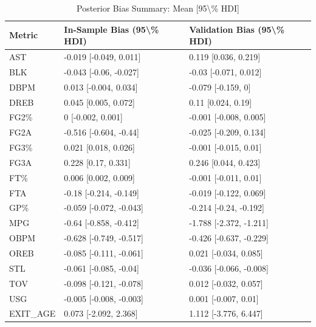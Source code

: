 \begin{table}[t]
\caption*{
{\fontsize{20}{25}\selectfont  Posterior Bias Summary: Mean [95\textbackslash{}\% HDI]\fontsize{12}{15}\selectfont }
} 
\fontsize{12.0pt}{14.0pt}\selectfont
\begin{tabular*}{\linewidth}{@{\extracolsep{\fill}}lll}
\toprule
Metric & In-Sample Bias (95\textbackslash{}\% HDI) & Validation Bias (95\textbackslash{}\% HDI) \\ 
\midrule\addlinespace[2.5pt]
AST & -0.019 [-0.049, 0.011] & 0.119 [0.036, 0.219] \\ 
BLK & -0.043 [-0.06, -0.027] & -0.03 [-0.071, 0.012] \\ 
DBPM & 0.013 [-0.004, 0.034] & -0.079 [-0.159, 0] \\ 
DREB & 0.045 [0.005, 0.072] & 0.11 [0.024, 0.19] \\ 
FG2\% & 0 [-0.002, 0.001] & -0.001 [-0.008, 0.005] \\ 
FG2A & -0.516 [-0.604, -0.44] & -0.025 [-0.209, 0.134] \\ 
FG3\% & 0.021 [0.018, 0.026] & -0.001 [-0.015, 0.01] \\ 
FG3A & 0.228 [0.17, 0.331] & 0.246 [0.044, 0.423] \\ 
FT\% & 0.006 [0.002, 0.009] & -0.001 [-0.011, 0.01] \\ 
FTA & -0.18 [-0.214, -0.149] & -0.019 [-0.122, 0.069] \\ 
GP\% & -0.059 [-0.072, -0.043] & -0.214 [-0.24, -0.192] \\ 
MPG & -0.64 [-0.858, -0.412] & -1.788 [-2.372, -1.211] \\ 
OBPM & -0.628 [-0.749, -0.517] & -0.426 [-0.637, -0.229] \\ 
OREB & -0.085 [-0.111, -0.061] & 0.021 [-0.034, 0.085] \\ 
STL & -0.061 [-0.085, -0.04] & -0.036 [-0.066, -0.008] \\ 
TOV & -0.098 [-0.121, -0.078] & 0.012 [-0.032, 0.057] \\ 
USG & -0.005 [-0.008, -0.003] & 0.001 [-0.007, 0.01] \\ 
EXIT\_AGE & 0.073 [-2.092, 2.368] & 1.112 [-3.776, 6.447] \\ 
\bottomrule
\end{tabular*}
\end{table}

